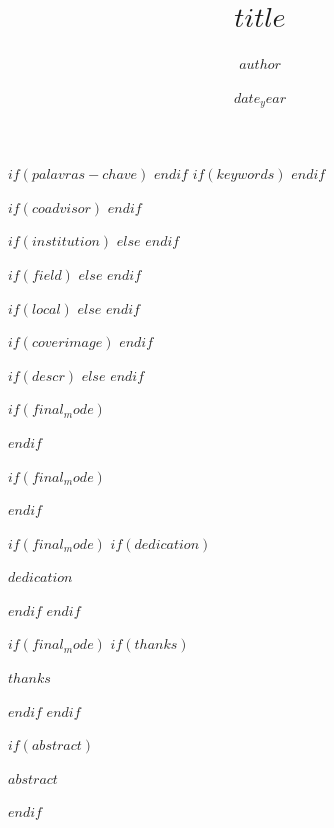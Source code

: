 \documentclass[final,oneside,english,brazilian]{ppginf}
\begin{document}

\title{$title$}

$if(palavras-chave)$
$endif$
$if(keywords)$
$endif$

\author{$author$}
$if(coadvisor)$
$endif$

$if(institution)$
$else$
$endif$

$if(field)$
$else$
$endif$

\date{$date_year$}

$if(local)$
$else$
$endif$

$if(coverimage)$
$endif$

$if(descr)$
$else$
$endif$


\frontmatter
\pagestyle{frontmatter}

\titlepage

$if(final_mode)$
\begin{ficha}

\end{ficha}
$endif$

$if(final_mode)$
\begin{aprovacao}

\end{aprovacao}
$endif$

$if(final_mode)$
$if(dedication)$
\begin{dedica}
$dedication$
\end{dedica}
$endif$
$endif$

$if(final_mode)$
$if(thanks)$
\begin{agradece}
$thanks$
\end{agradece}
$endif$
$endif$

$if(abstract)$
\begin{resumo}
$abstract$
\end{resumo}
$endif$
\end{document}
